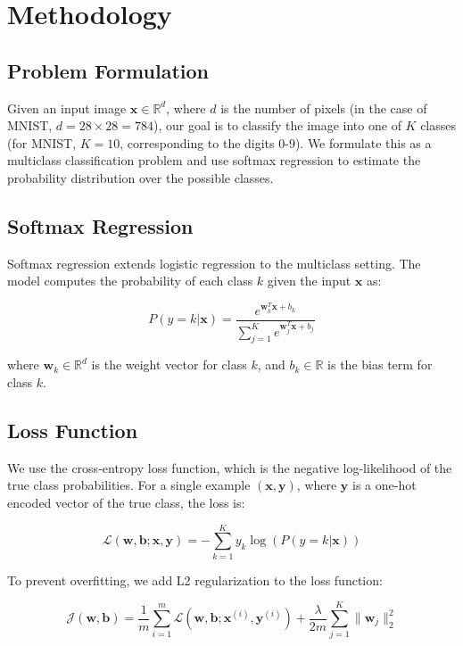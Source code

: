 \documentclass[10pt,journal,compsoc]{IEEEtran}
\begin{document}
\section{Methodology}
\subsection{Problem Formulation}
Given an input image $\mathbf{x} \in \mathbb{R}^d$, where $d$ is the number of pixels (in the case of MNIST, $d = 28 \times 28 = 784$), our goal is to classify the image into one of $K$ classes (for MNIST, $K = 10$, corresponding to the digits 0-9). We formulate this as a multiclass classification problem and use softmax regression to estimate the probability distribution over the possible classes.

\subsection{Softmax Regression}
Softmax regression extends logistic regression to the multiclass setting. The model computes the probability of each class $k$ given the input $\mathbf{x}$ as:

\begin{equation}
P(y = k | \mathbf{x}) = \frac{e^{\mathbf{w}_k^T \mathbf{x} + b_k}}{\sum_{j=1}^{K} e^{\mathbf{w}_j^T \mathbf{x} + b_j}}
\end{equation}

where $\mathbf{w}_k \in \mathbb{R}^d$ is the weight vector for class $k$, and $b_k \in \mathbb{R}$ is the bias term for class $k$.

\subsection{Loss Function}
We use the cross-entropy loss function, which is the negative log-likelihood of the true class probabilities. For a single example $(\mathbf{x}, \mathbf{y})$, where $\mathbf{y}$ is a one-hot encoded vector of the true class, the loss is:

\begin{equation}
\mathcal{L}(\mathbf{w}, \mathbf{b}; \mathbf{x}, \mathbf{y}) = -\sum_{k=1}^{K} y_k \log(P(y = k | \mathbf{x}))
\end{equation}

To prevent overfitting, we add L2 regularization to the loss function:

\begin{equation}
\mathcal{J}(\mathbf{w}, \mathbf{b}) = \frac{1}{m} \sum_{i=1}^{m} \mathcal{L}(\mathbf{w}, \mathbf{b}; \mathbf{x}^{(i)}, \mathbf{y}^{(i)}) + \frac{\lambda}{2m} \sum_{j=1}^{K} \|\mathbf{w}_j\|_2^2
\end{equation}
\end{document}
